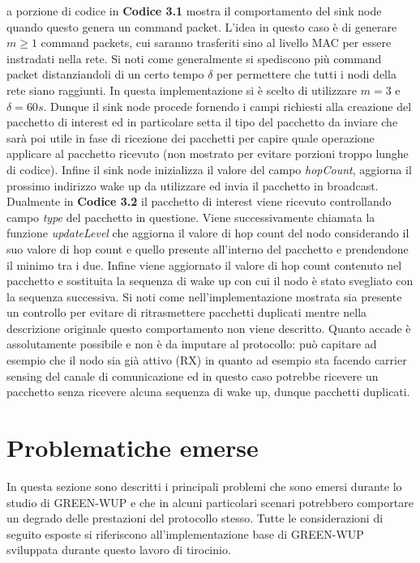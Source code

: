 \documentclass[binding=0.6cm,TFA]{sapthesis}
\begin{document}
\let\cleardoublepage    %

La porzione di codice in \textbf{Codice 3.1} mostra il comportamento del sink node quando questo genera un command packet. L'idea in questo caso è
di generare $m \geq 1 $ command packets, cui saranno trasferiti sino al livello MAC per essere instradati nella rete. Si noti come generalmente si
spediscono più command packet distanziandoli di un certo tempo $\delta$ per permettere che tutti i nodi della rete siano raggiunti. In questa
implementazione si è scelto di utilizzare $m=3$ e $\delta=60s$. Dunque il sink node procede fornendo i campi richiesti alla creazione del
pacchetto di interest ed in particolare setta il tipo del pacchetto da inviare che sarà poi utile in fase di ricezione dei pacchetti
per capire quale operazione applicare al pacchetto ricevuto (non mostrato per evitare porzioni troppo lunghe di codice). Infine il sink
node inizializza il valore del campo \emph{hopCount}, aggiorna il prossimo indirizzo wake up da utilizzare ed invia il pacchetto in broadcast.\\

Dualmente in \textbf{Codice 3.2} il pacchetto di interest viene ricevuto controllando campo \emph{type} del pacchetto in questione. Viene
successivamente chiamata la funzione \emph{updateLevel} che aggiorna il valore di hop count del nodo considerando il suo valore di hop count
e quello presente all'interno del pacchetto e prendendone il minimo tra i due. Infine viene aggiornato il valore di hop count contenuto
nel pacchetto e sostituita la sequenza di wake up con cui il nodo è stato svegliato con la sequenza successiva. Si noti come 
nell'implementazione mostrata sia presente un controllo per evitare di ritrasmettere pacchetti duplicati mentre nella descrizione originale
questo comportamento non viene descritto. Quanto accade è assolutamente possibile e non è da imputare al protocollo: può capitare ad esempio
che il nodo sia già attivo (RX) in quanto ad esempio sta facendo carrier sensing del canale di comunicazione ed in questo caso
potrebbe ricevere un pacchetto senza ricevere alcuna sequenza di wake up, dunque pacchetti duplicati.

\let\cleardoublepage\clearpage  %

\section{Problematiche emerse}

In questa sezione sono descritti i principali problemi che sono emersi durante lo studio di GREEN-WUP e che in alcuni particolari
scenari potrebbero comportare un degrado delle prestazioni del protocollo stesso. Tutte le considerazioni di seguito esposte si riferiscono
all'implementazione base di GREEN-WUP sviluppata durante questo lavoro di tirocinio.\\
\end{document}
